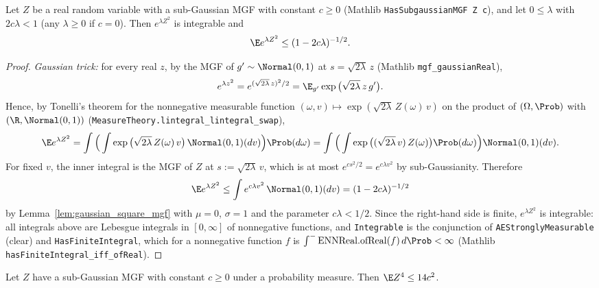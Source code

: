 \begin{lemma}
\label{lem:subgaussian_square_mgf_pos}
\leanok
{}
Let $Z$ be a real random variable with a sub-Gaussian MGF with constant $c \ge 0$
(Mathlib \texttt{HasSubgaussianMGF Z c}), and let $0 \le \lambda$ with $2c\lambda < 1$
(any $\lambda \ge 0$ if $c = 0$). Then $e^{\lambda Z^2}$ is integrable and
\[
  \E e^{\lambda Z^2} \le (1 - 2c\lambda)^{-1/2}.
\]
\end{lemma}

\begin{proof}
\leanok
{}
\emph{Gaussian trick:} for every real $z$, by the MGF of $g' \sim \Normal(0,1)$ at
$s = \sqrt{2\lambda}\,z$ (Mathlib \texttt{mgf\_gaussianReal}),
\[
  e^{\lambda z^2} = e^{(\sqrt{2\lambda}\,z)^2/2} = \E_{g'}\exp\big(\sqrt{2\lambda}\,z\,g'\big).
\]
Hence, by Tonelli's theorem for the nonnegative measurable function
$(\omega, v) \mapsto \exp(\sqrt{2\lambda}\,Z(\omega)\,v)$ on the product of $(\Omega,\Prob)$
with $(\R, \Normal(0,1))$ (\texttt{MeasureTheory.lintegral\_lintegral\_swap}),
\[
  \E e^{\lambda Z^2} = \int\Big(\int\exp\big(\sqrt{2\lambda}\,Z(\omega)\,v\big)\,\Normal(0,1)(dv)\Big)\Prob(d\omega)
  = \int\Big(\int\exp\big((\sqrt{2\lambda}\,v)\,Z(\omega)\big)\Prob(d\omega)\Big)\Normal(0,1)(dv).
\]
For fixed $v$, the inner integral is the MGF of $Z$ at $s := \sqrt{2\lambda}\,v$, which is at
most $e^{cs^2/2} = e^{c\lambda v^2}$ by sub-Gaussianity. Therefore
\[
  \E e^{\lambda Z^2} \le \int e^{c\lambda v^2}\,\Normal(0,1)(dv) = (1 - 2c\lambda)^{-1/2}
\]
by Lemma~\ref{lem:gaussian_square_mgf} with $\mu = 0$, $\sigma = 1$ and the parameter
$c\lambda < 1/2$. Since the right-hand side is finite, $e^{\lambda Z^2}$ is integrable: all
integrals above are Lebesgue integrals in $[0,\infty]$ of nonnegative functions, and
\texttt{Integrable} is the conjunction of \texttt{AEStronglyMeasurable} (clear) and
\texttt{HasFiniteIntegral}, which for a nonnegative function $f$ is
$\int^-\mathrm{ENNReal.ofReal}(f)\,d\Prob < \infty$ (Mathlib \texttt{hasFiniteIntegral\_iff\_ofReal}).
\end{proof}

\begin{lemma}\label{lem:subgaussian_fourth_moment}
\leanok
Let $Z$ have a sub-Gaussian MGF with constant $c \ge 0$ under a probability measure. Then
$\E Z^4 \le 14c^2$.
\end{lemma}


